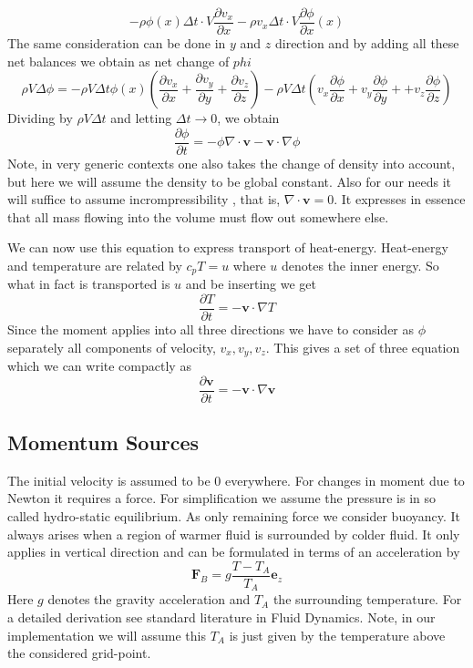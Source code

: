 \documentclass[]{article}
\begin{document}
\begin{equation*}
-\rho \phi(x)\Delta t\cdot V\frac{\partial v_x}{\partial x}
-\rho v_x\Delta t\cdot V \frac{\partial \phi}{\partial x}(x)
\end{equation*}
The same consideration can be done in $y$ and $z$ direction and by adding all these net balances we obtain as net change of $phi$
\begin{equation*}
\rho V \Delta \phi =
-\rho V \Delta t\phi(x)\left(\frac{\partial v_x}{\partial x} 
+\frac{\partial v_y}{\partial y}+\frac{\partial v_z}{\partial z}\right)
 -\rho V \Delta t \left(v_x \frac{\partial \phi}{\partial x}+
 v_y \frac{\partial \phi}{\partial y}+
 +v_z \frac{\partial \phi}{\partial z}\right)
\end{equation*}
Dividing by $\rho V \Delta t$ and letting $\Delta t\rightarrow 0$, we obtain
\begin{equation} \label{transp_equation}
\frac{\partial\phi}{\partial t}=-\phi\nabla\cdot\textbf{v} -\textbf{v}\cdot\nabla\phi
\end{equation}
Note, in very generic contexts one also takes the change of density into account, but here we will assume the density to be global constant.
Also for our needs it will suffice to assume incrompressibility , that is, $\nabla\cdot\textbf{v}=0$. It expresses in essence that all mass flowing into the volume must flow out somewhere else.

We can now use this equation to express transport of heat-energy. Heat-energy and temperature are 
related by $c_p T=u$ where $u$ denotes the inner energy. So what in fact is transported is $u$ and be inserting we get
\begin{equation} \label{transp_heat}
\frac{\partial T}{\partial t}=-\textbf{v}\cdot\nabla T
\end{equation}
Since the moment applies into all three directions we have to consider as $\phi$ separately all components of velocity, $v_x, v_y, v_z$. This gives a set of three equation which we can write compactly as
\begin{equation}
\frac{\partial\textbf{v}}{\partial t}=-\textbf{v}\cdot\nabla\textbf{v}
\end{equation}

\subsection{Momentum Sources}
The initial velocity is assumed to be 0 everywhere. For changes in moment due to Newton it requires a force. For simplification we assume the pressure is in so called hydro-static equilibrium. As only remaining force we consider buoyancy. It always arises when
a region of warmer fluid is surrounded by colder fluid. It only applies in vertical direction and
can be formulated in terms of an acceleration by
\begin{equation}
\textbf{F}_{B}=g\frac{T-T_{A}}{T_{A}}\textbf{e}_{z}
\end{equation}
Here $g$ denotes the gravity acceleration and $T_A$ the surrounding temperature.
For a detailed derivation see standard literature in Fluid Dynamics.
Note, in our implementation we will assume this $T_A$ is just given by the temperature above
the considered grid-point.
\end{document}

